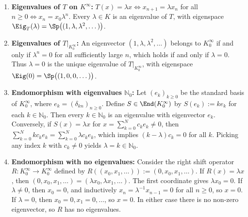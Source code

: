 \begin{exercisesolution*}
\label{sol:eigenvalues_infinite_dimensional_sequences}
\begin{enumerate}[label=\textbf{(\alph*)}]
    \item \textbf{Eigenvalues of $T$ on $K^\infty$:}
    $T(x) = \lambda x \iff x_{n+1} = \lambda x_n$ for all $n \ge 0 \iff x_n = x_0 \lambda^n$.
    Every $\lambda \in K$ is an eigenvalue of $T$, with eigenspace $\Eig_T(\lambda) = \Sp\big((1, \lambda, \lambda^2, \dots)\big)$.

    \item \textbf{Eigenvalues of $T|_{K_0^\infty}$:}
    An eigenvector $(1, \lambda, \lambda^2, \dots)$ belongs to $K_0^\infty$ if and only if $\lambda^n = 0$ for all sufficiently large $n$, which holds if and only if $\lambda = 0$.
    Thus $\lambda = 0$ is the unique eigenvalue of $T|_{K_0^\infty}$, with eigenspace $\Eig(0) = \Sp\big((1, 0, 0, \dots)\big)$.

    \item \textbf{Endomorphism with eigenvalues $\mathbb{N}_0$:}
    Let $(e_k)_{k \ge 0}$ be the standard basis of $K_0^\infty$, where $e_k = (\delta_{kn})_{n \ge 0}$. Define $S \in \End(K_0^\infty)$ by $S(e_k) := k e_k$ for each $k \in \mathbb{N}_0$.
    Then every $k \in \mathbb{N}_0$ is an eigenvalue with eigenvector $e_k$. Conversely, if $S(x) = \lambda x$ for $x = \sum_{k=0}^N c_k e_k \ne 0$, then $\sum_{k=0}^N k c_k e_k = \sum_{k=0}^N \lambda c_k e_k$, which implies $(k - \lambda) c_k = 0$ for all $k$. Picking any index $k$ with $c_k \ne 0$ yields $\lambda = k \in \mathbb{N}_0$.

    \item \textbf{Endomorphism with no eigenvalues:}
    Consider the right shift operator $R \colon K_0^\infty \to K_0^\infty$ defined by $R((x_0, x_1, \dots)) := (0, x_0, x_1, \dots)$.
    If $R(x) = \lambda x$, then $(0, x_0, x_1, \dots) = (\lambda x_0, \lambda x_1, \dots)$.
    The first coordinate gives $\lambda x_0 = 0$. If $\lambda \ne 0$, then $x_0 = 0$, and inductively $x_n = \lambda^{-1} x_{n-1} = 0$ for all $n \ge 0$, so $x = 0$. If $\lambda = 0$, then $x_0 = 0, x_1 = 0, \dots$, so $x = 0$.
    In either case there is no non-zero eigenvector, so $R$ has no eigenvalues. \qedhere
\end{enumerate}
\end{exercisesolution*}

